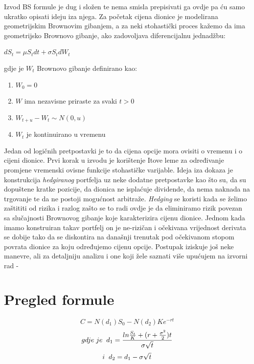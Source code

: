 \documentclass[times, utf8, seminar]{fer}
\begin{document}
Izvod BS formule je dug i složen te nema smisla prepisivati ga ovdje pa ću samo ukratko opisati ideju iza njega. Za početak cijena dionice je modelirana geometrijskim Brownovim gibanjem, a za neki stohastički proces kažemo da ima geometrijsko Brownovo gibanje, ako zadovoljava diferencijalnu jednadžbu:\\

\begin{centering}
    $dS_t = \mu S_t dt + \sigma S_t dW_t$ \\
\end{centering}

\vspace{1.5cm}

\noindent gdje je $W_t$ Brownovo gibanje definirano kao:
\begin{enumerate}
    \item $W_0 = 0$
    \item $W$ ima nezavisne priraste za svaki $t > 0$
    \item $W_{t+u} - W_t \sim N(0, u)$
    \item $W_t$ je kontinuirano u vremenu
\end{enumerate}

Jedan od logičnih pretpostavki je to da cijena opcije mora ovisiti o vremenu i o cijeni dionice. Prvi korak u izvodu je korištenje Itove leme za određivanje promjene vremenski ovisne funkcije stohastičke varijable. Ideja iza dokaza je konstrukcija \textit{hedgiranog} portfelja uz neke dodatne pretpostavke kao što su, da su dopuštene kratke pozicije, da dionica ne isplaćuje dividende, da nema naknada na trgovanje te da ne postoji mogućnost arbitraže. \textit{Hedging} se koristi kada se želimo zaštititi od rizika i razlog zašto se to radi ovdje je da eliminiramo rizik povezan sa slučajnosti Brownovog gibanje koje karakterizira cijenu dionice. Jednom kada imamo konstruiran takav portfelj on je ne-rizičan  i očekivana vrijednost derivata se dobije tako da se diskontira na današnji trenutak pod očekivanom stopom povrata dionice za koju određujemo cijenu opcije. Postupak iziskuje još neke manevre, ali za detaljniju analizu i one koji žele saznati više upućujem na izvorni rad - \cite{}

\section{Pregled formule}

\[ C = N(d_1)S_0 - N(d_2)Ke^{-rt} \]
\[ gdje \hspace{0.1cm} je \hspace{0.2cm} d_1 = \frac{ln\frac{S_t}{K} + (r+\frac{\sigma^2}{2})t}{\sigma\sqrt{t}} \]
\[i \hspace{0.2cm} d_2 = d_1 - \sigma \sqrt{t}\]
\end{document}

